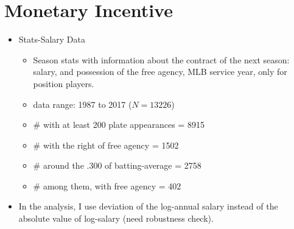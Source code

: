 \documentclass[dvipdfmx, 12pt]{article}
\begin{document}
\newpage

\section{Monetary Incentive}

\begin{itemize}

  \item Stats-Salary Data
  \begin{itemize}
    \item Season stats with information about the contract of the
    next season: salary, and possession of the free agency, MLB service
    year, only for position players.

    \item data range: 1987 to 2017 ($N=13226$)

    \item \# with at least 200 plate appearances = 8915

    \item \# with the right of free agency = 1502

    \item \# around the .300 of batting-average = 2758

    \item \# among them, with free agency = 402
  \end{itemize}

  \item In the analysis, I use deviation of the log-annual salary instead
  of the absolute value of log-salary (need robustness check).
\end{itemize}

\begin{landscape}
  \begin{table}
    

  \end{table}

  \begin{table}
    

  \end{table}

  \begin{table}
    

  \end{table}



\end{landscape}
\end{document}
